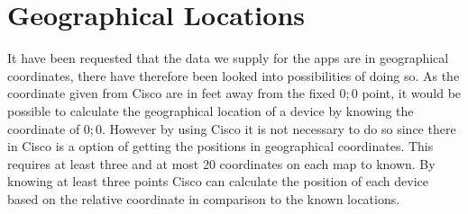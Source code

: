\section{Geographical Locations}
It have been requested that the data we supply for the apps are in geographical coordinates, there have therefore been looked into possibilities of doing so.
As the coordinate given from Cisco are in feet away from the fixed ${0;0}$ point, it would be possible to calculate the geographical location of a device by knowing the coordinate of ${0;0}$. However by using Cisco it is not necessary to do so since there in Cisco is a option of getting the positions in geographical coordinates. This requires at least three and at most 20 coordinates on each map to known. By knowing at least three points Cisco can calculate the position of each device based on the relative coordinate in comparison to the known locations.


